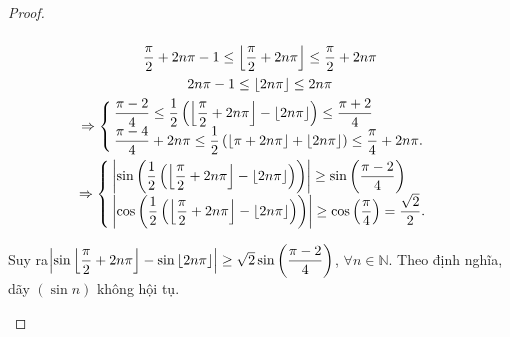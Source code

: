 \documentclass[class=analysis,crop=false]{standalone}
\begin{document}
\begin{proof}
\begin{enumerate}[label = (\roman*)]
\[            \]
            \begin{gather*}
                \dfrac{\pi}{2} + 2n\pi - 1\le \left\lfloor{\dfrac{\pi}{2} + 2n\pi}\right\rfloor \le \dfrac{\pi}{2} + 2n\pi \\
                2n\pi - 1\le \left\lfloor{2n\pi}\right\rfloor \le 2n\pi \\
                \Rightarrow
                \begin{cases}
                    \dfrac{\pi - 2}{4}\le\dfrac{1}{2}\left(\left\lfloor{\dfrac{\pi}{2} + 2n\pi}\right\rfloor - \left\lfloor{2n\pi}\right\rfloor\right) \le \dfrac{\pi + 2}{4} \\
                    \dfrac{\pi - 4}{4} + 2n\pi\le \dfrac{1}{2}\left(\left\lfloor{\pi + 2n\pi}\right\rfloor + \left\lfloor{2n\pi}\right\rfloor\right) \le \dfrac{\pi}{4} + 2n\pi.
                \end{cases} \\
                \Rightarrow
                \begin{cases}
                    \left\vert{\sin\left(\dfrac{1}{2}\left(\left\lfloor{\dfrac{\pi}{2} + 2n\pi}\right\rfloor - \left\lfloor{2n\pi}\right\rfloor\right)\right)}\right\vert \ge \sin\left(\dfrac{\pi - 2}{4}\right) \\
                    \left\vert{\cos\left(\dfrac{1}{2}\left(\left\lfloor{\dfrac{\pi}{2} + 2n\pi}\right\rfloor - \left\lfloor{2n\pi}\right\rfloor\right)\right)}\right\vert\ge\cos\left(\dfrac{\pi}{4}\right) = \dfrac{\sqrt{2}}{2}.
                \end{cases}
            \end{gather*}
            \par Suy ra$\left\vert{\sin\left\lfloor{\dfrac{\pi}{2} + 2n\pi}\right\rfloor - \sin\left\lfloor{2n\pi}\right\rfloor}\right\vert\ge \sqrt{2}\sin\left(\dfrac{\pi-2}{4}\right)$, $\forall n\in\mathbb{N}$. Theo định nghĩa, dãy $(\sin n)$ không hội tụ.
    \end{enumerate}
\end{proof}
\end{document}

